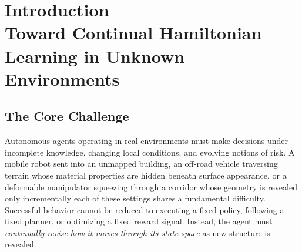 
\chapter{Introduction \\Toward Continual Hamiltonian Learning in Unknown Environments}
\label{chap:intro}

\section{The Core Challenge}
\label{sec:intro:challenge}

Autonomous agents operating in real environments must make decisions under
incomplete knowledge, changing local conditions, and evolving notions of risk.
A mobile robot sent into an unmapped building, an off-road vehicle traversing
terrain whose material properties are hidden beneath surface appearance, or a
deformable manipulator squeezing through a corridor whose geometry is revealed
only incrementally each of these settings shares a fundamental difficulty.
Successful behavior cannot be reduced to executing a fixed policy, following a
fixed planner, or optimizing a fixed reward signal.
Instead, the agent must \emph{continually revise how it moves through its state
space} as new structure is revealed.

